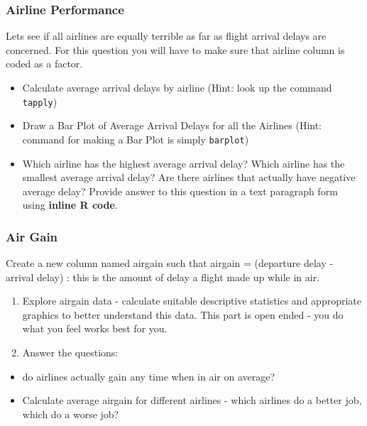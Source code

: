 \documentclass[
]{article}
\begin{document}
\hypertarget{airline-performance}{%
\subsubsection{Airline Performance}\label{airline-performance}}

Lets see if all airlines are equally terrible as far as flight arrival
delays are concerned. For this question you will have to make sure that
airline column is coded as a factor.

\begin{itemize}
\item
  Calculate average arrival delays by airline (Hint: look up the command
  \texttt{tapply})
\item
  Draw a Bar Plot of Average Arrival Delays for all the Airlines (Hint:
  command for making a Bar Plot is simply \texttt{barplot})
\item
  Which airline has the highest average arrival delay? Which airline has
  the smallest average arrival delay? Are there airlines that actually
  have negative average delay? Provide answer to this question in a text
  paragraph form using \textbf{inline R code}.
\end{itemize}

\hypertarget{air-gain}{%
\subsubsection{Air Gain}\label{air-gain}}

Create a new column named airgain such that airgain = (departure delay -
arrival delay) : this is the amount of delay a flight made up while in
air.

\begin{enumerate}
\def\labelenumi{\alph{enumi})}
\item
  Explore airgain data - calculate suitable descriptive statistics and
  appropriate graphics to better understand this data. This part is open
  ended - you do what you feel works best for you.
\item
  Answer the questions:
\end{enumerate}

\begin{itemize}
\item
  do airlines actually gain any time when in air on average?
\item
  Calculate average airgain for different airlines - which airlines do a
  better job, which do a worse job?
\end{itemize}
\end{document}
